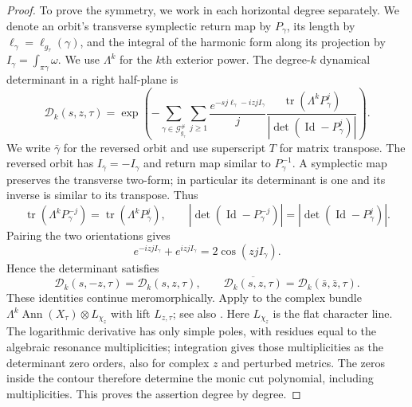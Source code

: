 \documentclass[11pt,letterpaper,reqno]{amsart}
\theoremstyle{remark}
\newcommand{\Id}{\operatorname{Id}}
\newcommand{\tr}{\operatorname{tr}}
\begin{document}
\begin{proof}
To prove the symmetry, we work in each horizontal degree separately.
We denote an orbit's transverse symplectic return map by $P_\gamma$,
its length by $\ell_\gamma=\ell_{g_\tau}(\gamma)$, and the integral
of the harmonic form along its projection by
$I_\gamma=\int_{\pi\gamma}\omega$. We use $\Lambda^k$ for the $k$th
exterior power. The degree-$k$ dynamical determinant in a right half-plane is
\[
 \mathscr D_k(s,z,\tau)=\exp\left(-\sum_{\gamma\in\mathcal G^\#_{g_\tau}}
 \sum_{j\geq1}\frac{e^{-sj\ell_\gamma-izjI_\gamma}}{j}
 \frac{\tr(\Lambda^kP_\gamma^j)}{|\det(\Id-P_\gamma^j)|}\right).
\]
We write $\bar\gamma$ for the reversed orbit and use superscript $T$
for matrix transpose. The reversed orbit has
$I_{\bar\gamma}=-I_\gamma$ and return map
similar to $P_\gamma^{-1}$. A symplectic map preserves the transverse
two-form; in particular its determinant is one and its inverse is
similar to its transpose. Thus
\[
 \tr(\Lambda^kP_\gamma^{-j})=\tr(\Lambda^kP_\gamma^j),\qquad
 |\det(\Id-P_\gamma^{-j})|=|\det(\Id-P_\gamma^j)|.
\]
Pairing the two orientations gives
\[
 e^{-izjI_\gamma}+e^{izjI_\gamma}=2\cos(zjI_\gamma).
\]
Hence the determinant satisfies
\[
 \mathscr D_k(s,-z,\tau)=\mathscr D_k(s,z,\tau),\qquad
 \overline{\mathscr D_k(s,z,\tau)}
   =\mathscr D_k(\bar s,\bar z,\tau).
\]
These identities continue meromorphically. Apply
\cite[Section~5, Theorem~4]{DG} to the complex bundle
$\Lambda^k\operatorname{Ann}(X_\tau)\otimes L_{\chi_z}$ with lift $L_{z,\tau}$;
see also \cite[Remark~3]{DGRS}. Here $L_{\chi_z}$ is the flat character line.
The logarithmic derivative has only simple poles, with residues equal to
the algebraic resonance multiplicities; integration gives those
multiplicities as the determinant zero orders, also for complex $z$
and perturbed metrics.
The zeros inside the contour therefore determine the monic cut
polynomial, including multiplicities. This proves the assertion
degree by degree.
\end{proof}
\end{document}
